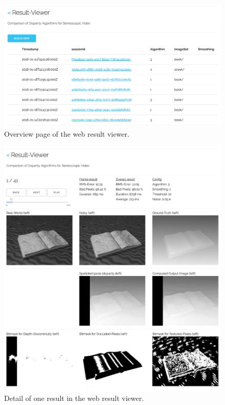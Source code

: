 \begin{figure}[h!]
  \centering
  \includegraphics[width=1.0\textwidth]{src/images/result-viewer-overview.png}
  \caption[Overview page of the web result viewer]{Overview page of the web result viewer.}
  \label{fig:web-overview}
\end{figure}

\begin{figure}[p!]
  \centering
  \includegraphics[width=1.0\textwidth]{src/images/result-viewer-detail.png}
  \caption{Detail of one result in the web result viewer.}
  \label{fig:web-detail}
\end{figure}
